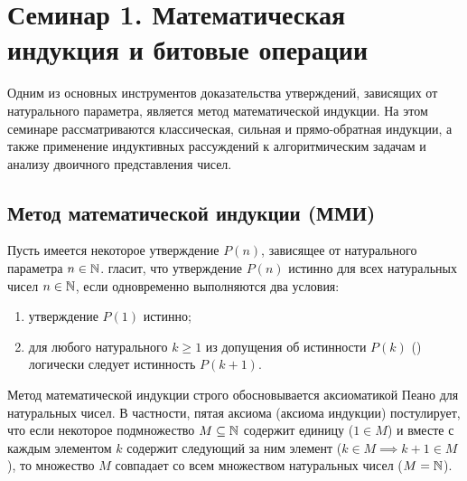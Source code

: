 \section{Семинар 1. Математическая индукция и битовые операции}

\begin{remark}
    Одним из основных инструментов доказательства утверждений, зависящих от 
    натурального параметра, является метод математической индукции. На этом 
    семинаре рассматриваются классическая, сильная и прямо-обратная 
    индукции, а также применение индуктивных рассуждений к алгоритмическим 
    задачам и анализу двоичного представления чисел.
\end{remark}

\subsection{Метод математической индукции (ММИ)}

\begin{definition}
    Пусть имеется некоторое утверждение $P(n)$, зависящее от натурального 
    параметра $n \in \mathbb{N}$.  гласит, 
    что утверждение $P(n)$ истинно для всех натуральных чисел $n \in \mathbb{N}$, 
    если одновременно выполняются два условия:
    \begin{enumerate}
        \item {} утверждение $P(1)$ истинно;
        \item {} для любого натурального 
        $k \ge 1$ из допущения об истинности $P(k)$ () логически следует истинность $P(k + 1)$.
    \end{enumerate}
\end{definition}

\begin{remark}
    Метод математической индукции строго обосновывается аксиоматикой Пеано 
    для натуральных чисел. В частности, пятая аксиома (аксиома индукции) 
    постулирует, что если некоторое подмножество $M \subseteq \mathbb{N}$ содержит 
    единицу ($1 \in M$) и вместе с каждым элементом $k$ содержит 
    следующий за ним элемент ($k \in M \implies k + 1 \in M$), то множество 
    $M$ совпадает со всем множеством натуральных чисел ($M = \mathbb{N}$).
\end{remark}

